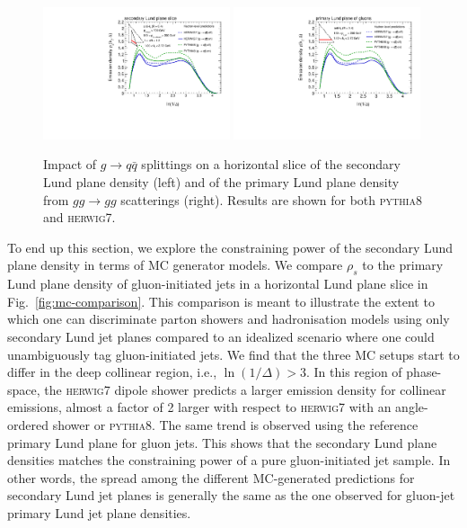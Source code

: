 \documentclass[a4paper,11pt]{article}
\newcommand{\py}{{\textsc{pythia}}8\xspace}
\newcommand{\hw}{{\textsc{herwig}}7\xspace}
\begin{document}
\begin{figure}
    \centering
    \includegraphics[width = 0.49\textwidth]{figures/Figure5a.pdf}
        \includegraphics[width = 0.49\textwidth]{figures/Figure5b.pdf}
    \caption{Impact of $g\to q\bar q$ splittings on a horizontal slice of the secondary Lund plane density (left) and of the primary Lund plane density from $gg\to gg$ scatterings (right). Results are shown for both \py and \hw.}
    \label{fig:g2qqBarOff}
\end{figure}

To end up this section, we explore the constraining power of the secondary Lund plane density in terms of MC generator models. We compare $\rho_s$ to the primary Lund plane density of gluon-initiated jets in a horizontal Lund plane slice in Fig.~\ref{fig:mc-comparison}. This comparison is meant to illustrate the extent to which one can discriminate parton showers and hadronisation models using only secondary Lund jet planes compared to an idealized scenario where one could unambiguously tag gluon-initiated jets. We find that the three MC setups start to differ in the deep collinear region, i.e., $\ln(1/\Delta)>3$. In this region of phase-space, the \hw dipole shower predicts a larger emission density for collinear emissions, almost a factor of 2 larger with respect to \hw with an angle-ordered shower or \py. The same trend is observed using the reference primary Lund plane for gluon jets. This shows that the secondary Lund plane densities matches the constraining power of a pure gluon-initiated jet sample. In other words, the spread among the different MC-generated predictions for secondary Lund jet planes is generally the same as the one observed for gluon-jet primary Lund jet plane densities.
\end{document}
